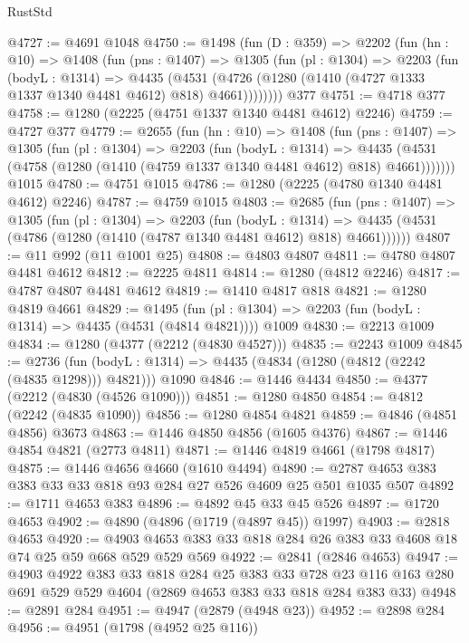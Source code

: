 \begin{lexlean}{RustStd}
\begin{coremodule}
{\begin{coremodule}
{{{{{{{{{{{{@4727 := @4691 @1048
@4750 := @1498
    (fun (D : @359) =>
    @2202
      (fun (hn : @10) =>
      @1408
        (fun (pns : @1407) =>
        @1305
          (fun (pl : @1304) =>
          @2203
            (fun (bodyL : @1314) =>
            @4435
              (@4531 (@4726 (@1280 (@1410 (@4727 @1333 @1337 @1340 @4481 @4612) @818) @4661))))))))
    @377
@4751 := @4718 @377
@4758 := @1280 (@2225 (@4751 @1337 @1340 @4481 @4612) @2246)
@4759 := @4727 @377
@4779 := @2655
    (fun (hn : @10) =>
    @1408
      (fun (pns : @1407) =>
      @1305
        (fun (pl : @1304) =>
        @2203
          (fun (bodyL : @1314) =>
          @4435 (@4531 (@4758 (@1280 (@1410 (@4759 @1337 @1340 @4481 @4612) @818) @4661)))))))
    @1015
@4780 := @4751 @1015
@4786 := @1280 (@2225 (@4780 @1340 @4481 @4612) @2246)
@4787 := @4759 @1015
@4803 := @2685
    (fun (pns : @1407) =>
    @1305
      (fun (pl : @1304) =>
      @2203
        (fun (bodyL : @1314) =>
        @4435 (@4531 (@4786 (@1280 (@1410 (@4787 @1340 @4481 @4612) @818) @4661))))))
@4807 := @11 @992 (@11 @1001 @25)
@4808 := @4803 @4807
@4811 := @4780 @4807 @4481 @4612
@4812 := @2225 @4811
@4814 := @1280 (@4812 @2246)
@4817 := @4787 @4807 @4481 @4612
@4819 := @1410 @4817 @818
@4821 := @1280 @4819 @4661
@4829 := @1495
    (fun (pl : @1304) => @2203 (fun (bodyL : @1314) => @4435 (@4531 (@4814 @4821))))
    @1009
@4830 := @2213 @1009
@4834 := @1280 (@4377 (@2212 (@4830 @4527)))
@4835 := @2243 @1009
@4845 := @2736
    (fun (bodyL : @1314) => @4435 (@4834 (@1280 (@4812 (@2242 (@4835 @1298))) @4821)))
    @1090
@4846 := @1446 @4434
@4850 := @4377 (@2212 (@4830 (@4526 @1090)))
@4851 := @1280 @4850
@4854 := @4812 (@2242 (@4835 @1090))
@4856 := @1280 @4854 @4821
@4859 := @4846 (@4851 @4856) @3673
@4863 := @1446 @4850 @4856 (@1605 @4376)
@4867 := @1446 @4854 @4821 (@2773 @4811)
@4871 := @1446 @4819 @4661 (@1798 @4817)
@4875 := @1446 @4656 @4660 (@1610 @4494)
@4890 := @2787 @4653 @383 @383 @33 @33 @818 @93 @284 @27 @526 @4609 @25 @501 @1035 @507
@4892 := @1711 @4653 @383
@4896 := @4892 @45 @33 @45 @526
@4897 := @1720 @4653
@4902 := @4890 (@4896 (@1719 (@4897 @45)) @1997)
@4903 := @2818 @4653
@4920 := @4903 @4653 @383 @33 @818 @284 @26 @383 @33 @4608 @18 @74 @25 @59 @668 @529 @529 @569
@4922 := @2841 (@2846 @4653)
@4947 := @4903
    @4922
    @383
    @33
    @818
    @284
    @25
    @383
    @33
    @728
    @23
    @116
    @163
    @280
    @691
    @529
    @529
    @4604
    (@2869 @4653 @383 @33 @818 @284 @383 @33)
@4948 := @2891 @284
@4951 := @4947 (@2879 (@4948 @23))
@4952 := @2898 @284
@4956 := @4951 (@1798 (@4952 @25 @116))
}}}}}}}}}}}}
\end{coremodule}}
\end{coremodule}
\end{lexlean}
